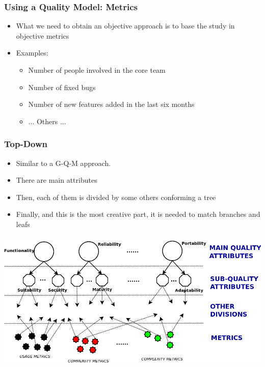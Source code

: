 \documentclass{beamer}
\begin{document}
\begin{frame}
\frametitle{Using a Quality Model: Metrics}
\begin{center}
\begin{itemize}
 \item What we need to obtain an objective approach is to base the study in objective metrics
 \item Examples:
 \begin{itemize}
  \item Number of people involved in the core team
  \item Number of fixed bugs
  \item Number of new features added in the last six months
  \item ... Others ...
 \end{itemize}
\end{itemize}
\end{center}
\end{frame}


\begin{frame}
\frametitle{Top-Down}
\begin{center}
\begin{itemize}
 \item Similar to a G-Q-M approach.
 \item There are main attributes
 \item Then, each of them is divided by some others conforming a tree
 \item Finally, and this is the most creative part, it is needed to match branches and leafs
\end{itemize}
\end{center}
\end{frame}


\begin{frame}
\frametitle{}
\begin{center}

 \includegraphics[scale=0.35]{figs/tree-quality-diagram.png}

\end{center}
\end{frame}
\end{document}
